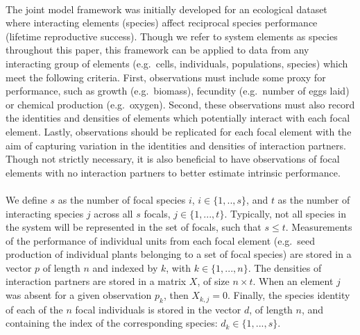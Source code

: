 \documentclass[a4,12pt]{article}
\begin{document}
\begin{refsection}
    \paragraph{}
    The joint model framework was initially developed for an ecological dataset where interacting elements (species) affect reciprocal species performance (lifetime reproductive success). Though we refer to system elements as species throughout this paper, this framework can be applied to data from any interacting group of elements (e.g.\ cells, individuals, populations, species) which meet the following criteria. First, observations must include some proxy for performance, such as growth (e.g.\ biomass), fecundity (e.g.\ number of eggs laid) or chemical production (e.g.\ oxygen). Second, these observations must also record the identities and densities of elements which potentially interact with each focal element. Lastly, observations should be replicated for each focal element with the aim of capturing variation in the identities and densities of interaction partners. Though not strictly necessary, it is also beneficial to have observations of focal elements with no interaction partners to better estimate intrinsic performance. 

    \paragraph{}
    We define $s$ as the number of focal species $i$, $i \in \{ 1, .., s \}$, and $t$ as the number of interacting species $j$ across all $s$ focals, $j \in \{1, ..., t \}$. Typically, not all species in the system will be represented in the set of focals, such that $s \le t$. Measurements of the performance of individual units from each focal element (e.g.\ seed production of individual plants belonging to a set of focal species) are stored in a vector $p$ of length $n$ and indexed by $k$, with $k \in \{1, ..., n \}$. The densities of interaction partners are stored in a matrix $X$, of size $n \times t$. When an element $j$ was absent for a given observation $p_k$, then $X_{k,j} = 0$. Finally, the species identity of each of the $n$ focal individuals is stored in the vector $d$, of length $n$, and containing the index of the corresponding species: $d_k \in \{1, ..., s \}$.


\end{refsection}
\end{document}
